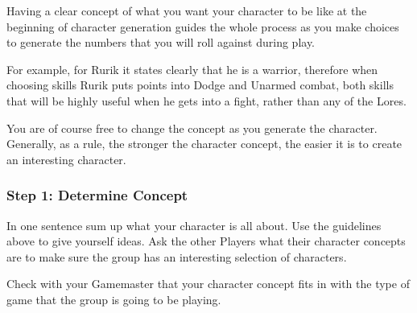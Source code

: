 Having a clear concept of what you want your character to be like at the beginning of character generation guides the whole process as you make choices to generate the numbers that you will roll against during play.

For example, for Rurik it states clearly that he is a warrior, therefore when choosing skills Rurik puts points into Dodge and Unarmed combat, both skills that will be highly useful when he gets into a fight, rather than any of the Lores.

You are of course free to change the concept as you generate the character. Generally, as a rule, the stronger the character concept, the easier it is to create an interesting character.




\subsubsection{Step 1: Determine Concept}
In one sentence sum up what your character is all about. Use the guidelines above to give yourself ideas. Ask the other Players what their character concepts are to make sure the group has an interesting selection of characters.

Check with your Gamemaster that your character concept fits in with the type of game that the group is going to be playing.


